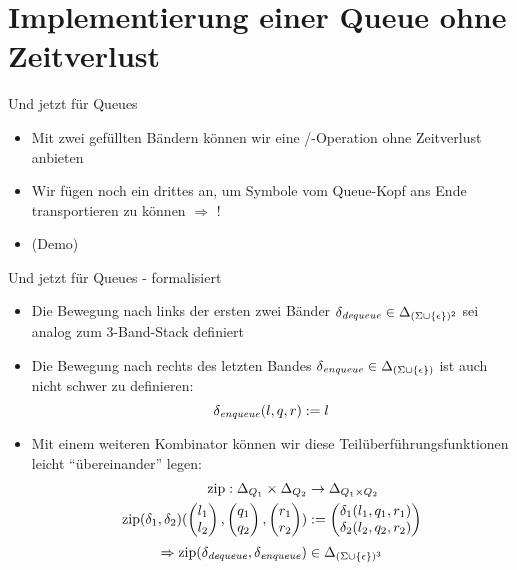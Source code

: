 \documentclass{beamer}
\DeclareMathOperator{\zip}{zip}
\begin{document}
\section{Implementierung einer Queue ohne Zeitverlust}

\begin{frame}{Und jetzt für Queues}
    \begin{itemize}
        \item Mit zwei gefüllten Bändern können wir eine \pop/\dequeue-Operation ohne Zeitverlust anbieten
        \item Wir fügen noch ein drittes an, um Symbole vom Queue-Kopf ans Ende transportieren zu können $\Rightarrow$ \enqueue!
            \begin{center}
            \end{center}
        \item (Demo)
    \end{itemize}
\end{frame}

\begin{frame}{Und jetzt für Queues - formalisiert}
    \begin{itemize}
        \item Die Bewegung nach links der ersten zwei Bänder $\delta_{\mathit{dequeue}} \in \Delta_{(\Sigma \cup \{\epsilon\})^2}$ sei analog zum 3-Band-Stack definiert
        \item Die Bewegung nach rechts des letzten Bandes $\delta_{\mathit{enqueue}} \in \Delta_{(\Sigma \cup \{\epsilon\})}$ ist auch nicht schwer zu definieren:
            \[ \delta_{\mathit{enqueue}}(l,q,r) := l \]
        \item Mit einem weiteren Kombinator können wir diese Teilüberführungsfunktionen leicht "`übereinander"' legen:
            \begin{align*}
                \zip : \Delta_{Q_1} \times \Delta_{Q_2} &\rightarrow \Delta_{Q_1 \times Q_2} \\
                \zip(\delta_1, \delta_2)(\vet{l_1}{l_2},\vet{q_1}{q_2},\vet{r_1}{r_2}) &:= \vet{\delta_1(l_1,q_1,r_1)}{\delta_2(l_2,q_2,r_2)}
            \end{align*}
            \vspace{0.1cm}
            \[ \Rightarrow \zip(\delta_\dequeue,\delta_\enqueue) \in \Delta_{(\Sigma \cup \{\epsilon\})^3} \]
    \end{itemize}
\end{frame}
\end{document}
